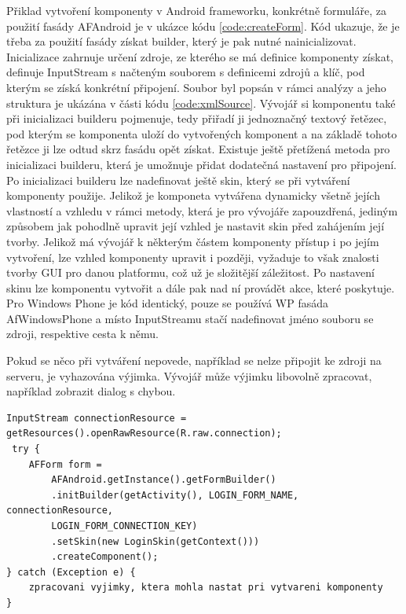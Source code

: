 Přiklad vytvoření komponenty v Android frameworku, konkrétně formuláře, za použití fasády AFAndroid je v ukázce kódu \ref{code:createForm}. Kód ukazuje, že je třeba za použití fasády získat builder, který je pak nutné nainicializovat. Inicializace zahrnuje určení zdroje, ze kterého se má definice komponenty získat, definuje InputStream s načteným souborem s definicemi zdrojů a klíč, pod kterým se získá konkrétní připojení. Soubor byl popsán v rámci analýzy a jeho struktura je ukázána v části kódu \ref{code:xmlSource}. Vývojář si komponentu také při inicializaci builderu pojmenuje, tedy přiřadí ji jednoznačný textový řetězec, pod kterým se komponenta uloží do vytvořených komponent a na základě tohoto řetězce ji lze odtud skrz fasádu opět získat. Existuje ještě přetížená metoda pro inicializaci builderu, která je umožnuje přidat dodatečná nastavení pro připojení. Po inicializaci builderu lze nadefinovat ještě skin, který se při vytváření komponenty použije. Jelikož je komponeta vytvářena dynamicky všetně jejích vlastností a vzhledu v rámci metody, která je pro vývojáře zapouzdřená, jediným způsobem jak pohodlně upravit její vzhled je nastavit skin před zahájením její tvorby. Jelikož má vývojář k některým částem komponenty přístup i po jejím vytvoření, lze vzhled komponenty upravit i později, vyžaduje to však znalosti tvorby GUI pro danou platformu, což už je složitější záležitost. Po nastavení skinu lze komponentu vytvořit a dále pak nad ní provádět akce, které poskytuje.  Pro Windows Phone je kód identický, pouze se používá WP fasáda AfWindowsPhone a místo InputStreamu stačí nadefinovat jméno souboru se zdroji, respektive cesta k němu.

Pokud se něco při vytváření nepovede,  například se nelze připojit ke zdroji na serveru, je vyhazována výjimka. Vývojář může výjimku libovolně zpracovat, například zobrazit dialog s chybou.

\begin{lstlisting}[caption=Ukázka tvorby formuláře,
label={code:createForm}, basicstyle=\footnotesize]
InputStream connectionResource = getResources().openRawResource(R.raw.connection);
 try {
	AFForm form = 
		AFAndroid.getInstance().getFormBuilder()
		.initBuilder(getActivity(), LOGIN_FORM_NAME, connectionResource, 
		LOGIN_FORM_CONNECTION_KEY)
		.setSkin(new LoginSkin(getContext()))
		.createComponent();
} catch (Exception e) {
	zpracovani vyjimky, ktera mohla nastat pri vytvareni komponenty
}
\end{lstlisting} 

